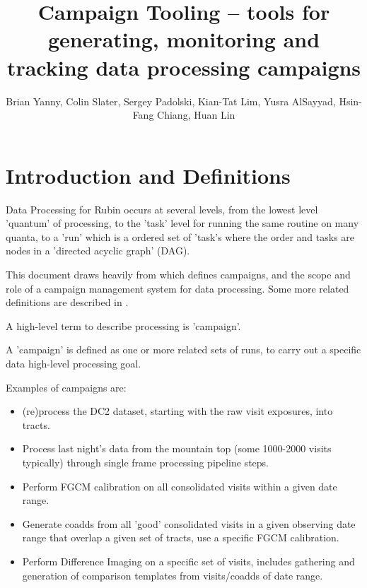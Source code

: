\documentclass[DM,authoryear,toc]{lsstdoc}
\title{Campaign Tooling -- tools for generating, monitoring and tracking data processing campaigns}
\author{%
Brian Yanny, Colin Slater, Sergey Padolski, Kian-Tat Lim, Yusra AlSayyad, Hsin-Fang Chiang, Huan Lin
}
\date{\vcsDate}
\begin{document}
\maketitle


\section{Introduction and Definitions}

Data Processing for Rubin occurs at several levels,
from the lowest level 'quantum' of processing, to the 'task' level for running
the same routine on many quanta, to a 'run' which is a ordered set of 'task's
where the order and tasks are nodes in a 'directed acyclic graph' (DAG).

This document draws heavily from \cite{DMTN-181} which defines campaigns, and 
the scope and role of a campaign management system for data processing.
Some more related definitions are described in \cite{DMTN-137}.

A high-level term to describe processing is 'campaign'.

A 'campaign' is defined as one or more related sets of runs, to carry out a
specific data high-level processing goal.  

Examples of campaigns are:

\begin{itemize}

\item (re)process the DC2 dataset, starting with the raw visit exposures,
 into tracts.  

\item Process last night's data from the mountain top (some 1000-2000 visits 
typically) through single frame processing pipeline steps.

\item Perform FGCM calibration on all consolidated visits within a given
date range.

\item Generate coadds from all 'good' consolidated visits in a given observing
date range that overlap a given set of tracts, use a specific FGCM calibration.

\item Perform Difference Imaging on a specific set of visits, includes gathering
and generation of comparison templates from visits/coadds of date range.

\end{itemize} 
\end{document}
